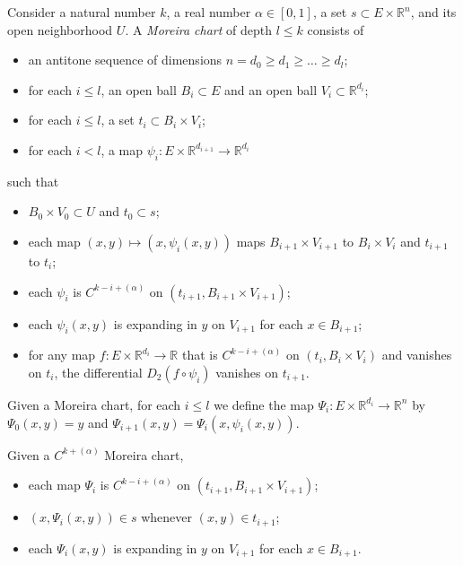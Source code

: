 \begin{definition}%
  \label{def:moreira-chart}
  Consider a natural number \(k\), a real number \(\alpha\in[0, 1]\),
  a set \(s \subset E \times \mathbb R^{n}\), and its open neighborhood \(U\).
  A \emph{Moreira chart} of depth \(l \le k\) consists of
  \begin{itemize}
  \item an antitone sequence of dimensions \(n = d_{0}\ge d_{1}\ge \dots \ge d_{l}\);
  \item for each \(i \le l\), an open ball \(B_{i} \subset E\) and an open ball \(V_{i}\subset \mathbb R^{d_{i}}\);
  \item for each \(i \le l\), a set \(t_{i}\subset B_{i}\times V_{i}\);
  \item for each \(i < l\), a map \(\psi_{i}\colon E\times \mathbb R^{d_{i+1}} \to \mathbb R^{d_{i}}\)
  \end{itemize}
  such that
  \begin{itemize}
  \item \(B_{0}\times V_{0}\subset U\) and \(t_{0}\subset s\);
  \item each map \((x, y) \mapsto (x, \psi_{i}(x, y))\)
    maps \(B_{i+1}\times V_{i+1}\) to \(B_{i}\times V_{i}\) and \(t_{i+1}\) to \(t_{i}\);
  \item each \(\psi_{i}\) is \(C^{k-i+(\alpha)}\) on \((t_{i+1}, B_{i+1}\times V_{i+1})\);
  \item each \(\psi_{i}(x, y)\) is expanding in \(y\) on \(V_{i+1}\) for each \(x \in B_{i + 1}\);
  \item for any map \(f\colon E\times \mathbb R^{d_{i}} \to \mathbb R\)
    that is \(C^{k-i+(\alpha)}\) on \((t_{i}, B_{i}\times V_{i})\) and vanishes on \(t_{i}\),
    the differential \(D_{2}(f \circ \psi_{i})\) vanishes on \(t_{i+1}\).
  \end{itemize}
\end{definition}

\begin{definition}%
  \label{def:moreira-chart-map}
  Given a Moreira chart, for each \(i \le l\) we define the map \(\Psi_{i}\colon E\times \mathbb R^{d_{i}}\to \mathbb R^{n}\)
  by \(\Psi_{0}(x, y)=y\) and \(\Psi_{i+1}(x, y)=\Psi_{i}(x, \psi_{i}(x, y))\).
\end{definition}

\begin{lemma}%
  \label{lem:moreira-chart-map-props}
  Given a \(C^{k+(\alpha)}\) Moreira chart,
  \begin{itemize}
  \item each map \(\Psi_{i}\) is \(C^{k-i+(\alpha)}\) on \((t_{i+1}, B_{i+1}\times V_{i+1})\);
  \item \((x, \Psi_{i}(x, y)) \in s\) whenever \((x, y) \in t_{i+1}\);
  \item each \(\Psi_{i}(x, y)\) is expanding in \(y\) on \(V_{i+1}\) for each \(x\in B_{i+1}\).
  \end{itemize}
\end{lemma}

